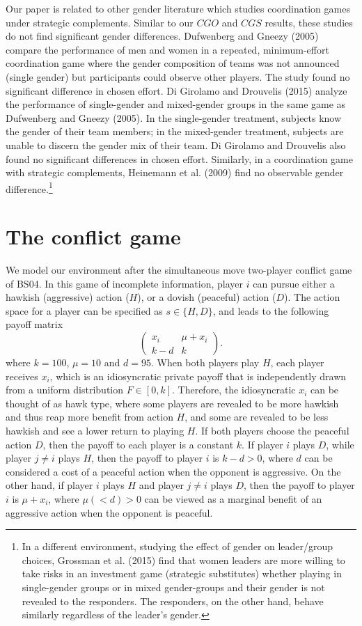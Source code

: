 \documentclass[11pt, letterpaper]{article}
\theoremstyle{plain}
\begin{document}
Our paper is related to other gender literature which studies coordination games under strategic complements. Similar to our $CGO$ and $CGS$ results, these studies do not find significant gender differences.  Dufwenberg and Gneezy (2005) compare the performance of men and women in a repeated, minimum-effort coordination game where the gender composition of teams was not announced (single gender) but participants could observe other players. The study found no significant difference in chosen effort. Di Girolamo and Drouvelis (2015) analyze the performance of single-gender and mixed-gender groups in the same game as Dufwenberg and Gneezy (2005). In the single-gender treatment, subjects know the gender of their team members; in the mixed-gender treatment, subjects are unable to discern the gender mix of their team. Di Girolamo and Drouvelis also found no significant differences in chosen effort. Similarly, in a coordination game with strategic complements, Heinemann et al. (2009) find no observable gender difference.\footnote{In a different environment, studying the effect of gender on leader/group choices, Grossman et al. (2015) find that women leaders are more willing to take risks in an investment game (strategic substitutes) whether playing in single-gender groups or in mixed gender-groups and their gender is not revealed to the responders. The responders, on the other hand, behave similarly regardless of the leader's gender.}

\section{The conflict game}
\label{sec:model}
We model our environment after the simultaneous move two-player conflict game of BS04. In this game of incomplete information, player $i$ can pursue either a hawkish (aggressive) action ($H$), or a dovish (peaceful) action ($D$). The action space for a player can be specified as $s\in\{H,D\}$, and leads to the following payoff matrix
\begin{equation}
\begin{pmatrix}
x_i & \mu+x_i \\
k-d & k 
\label{t:payoff}
\end{pmatrix}.
\end{equation}
where $k=100$, $\mu=10$ and $d=95$. When both players play $H$, each player receives $x_i$, which is an idiosyncratic private payoff that is independently drawn from a uniform distribution $F\in [0,k]$. Therefore, the idiosyncratic $x_i$ can be thought of as hawk type, where some players are revealed to be more hawkish and thus reap more benefit from action $H$, and some are revealed to be less hawkish and see a lower return to playing $H$. If both players choose the peaceful action $D$, then the payoff to each player is a constant $k$. If player $i$ plays $D$, while player $j\neq i$ plays $H$, then the payoff to player $i$ is $k-d>0$, where $d$ can be considered a cost of a peaceful action when the opponent is aggressive. On the other hand, if player $i$ plays $H$ and player $j\neq i$ plays $D$, then the payoff to player $i$ is $\mu+x_i$, where $\mu (<d)>0$ can be viewed as a marginal benefit of an aggressive action when the opponent is peaceful. 
\end{document}
